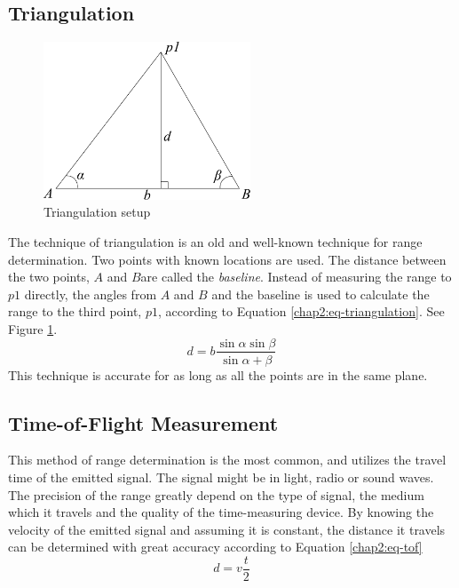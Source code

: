 \subsection{Triangulation}
\begin{figure}[htbp]
    \centering
    \includegraphics[width=0.55\textwidth]{pics/triangulation}
    \caption{Triangulation setup}
    \label{chap2:fig-triangulation}
\end{figure}
The technique of triangulation is an old and well-known technique for range determination.
Two points with known locations are used. The distance between the two points, $A$ and $B $are called
the \emph{baseline}. Instead of measuring the range to $p1$ directly, the angles
from $A$ and $B$ and the baseline is used to calculate the range to the third point, $p1$,
according to Equation \ref{chap2:eq-triangulation}. See Figure
\ref{chap2:fig-triangulation}.
\begin{equation}
    \label{chap2:eq-triangulation}
    d = b \frac{\sin{\alpha} \sin{\beta}}{\sin{\alpha + \beta}}
\end{equation}
This technique is accurate for as long as all the points are in the same plane.


\subsection{Time-of-Flight Measurement}
This method of range determination is the most common, and utilizes the travel time of the
emitted signal. The signal might be in light, radio or sound waves. The precision of the
range greatly depend on the type of signal, the medium which it travels and the quality of
the time-measuring device. By knowing the velocity of the emitted signal and assuming it
is constant, the distance it travels can be determined with great accuracy according to 
Equation \eqref{chap2:eq-tof}
\begin{equation}
    \label{chap2:eq-tof}
    d = v \frac{t}{2}
\end{equation}



